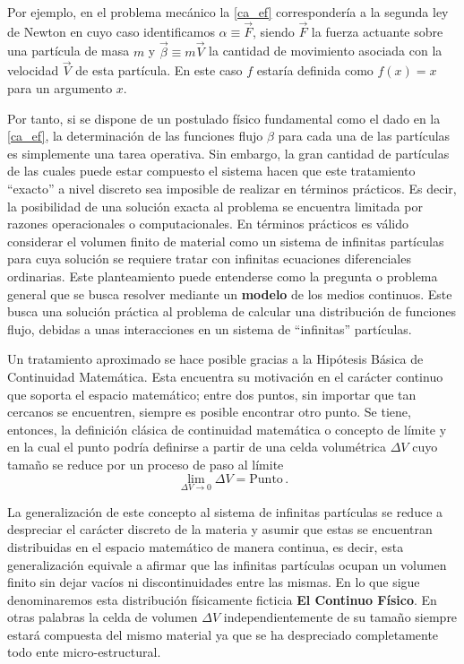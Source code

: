 \documentclass[../notas medios.tex]{subfiles}
\begin{document}
Por ejemplo, en el problema mecánico la \cref{ca_ef} correspondería a la segunda ley de Newton en cuyo caso identificamos $\alpha  \equiv \vec F$, siendo $\vec F$ la fuerza actuante sobre una partícula de masa $m$ y $\vec \beta  \equiv m\vec V$  la cantidad de movimiento asociada con la velocidad $\vec V$ de esta partícula.  En este caso $f$ estaría definida como  $f(x)=x$ para un argumento $x$.

Por tanto, si se dispone de un postulado físico fundamental como el dado en
la \cref{ca_ef}, la determinación de las funciones flujo $\beta$ para cada una de las partículas es simplemente una tarea operativa.  Sin embargo, la gran cantidad de partículas de las cuales puede estar compuesto el sistema hacen que este tratamiento ``exacto” a nivel discreto sea imposible de realizar en términos prácticos.  Es decir, la posibilidad de una solución exacta al problema se encuentra limitada por razones operacionales o computacionales. En términos prácticos es válido considerar el volumen finito de material como un sistema de infinitas partículas para cuya solución se requiere tratar con infinitas ecuaciones diferenciales ordinarias.  Este planteamiento puede entenderse como la pregunta o problema general que se busca resolver mediante un {\bf modelo} de los medios continuos. Este busca una solución práctica al problema de calcular una distribución de funciones flujo, debidas a unas interacciones en un sistema de ``infinitas” partículas.

Un tratamiento aproximado se hace posible gracias a la Hipótesis Básica de Continuidad Matemática.  Esta encuentra su motivación en el carácter continuo que soporta el espacio matemático; entre dos puntos, sin importar que tan cercanos se encuentren, siempre es posible encontrar otro punto. Se tiene, entonces,  la definición clásica de continuidad matemática o concepto de límite y en la cual el punto podría definirse a partir de una celda volumétrica $\Delta V$ cuyo tamaño se reduce por un proceso de paso al límite
\begin{equation}
\mathop {\lim }\limits_{\Delta V \to 0} \Delta V = \text{Punto}\, .
\label{lim_point}
\end{equation}

La generalización de este concepto al sistema de infinitas partículas se reduce a despreciar el carácter discreto de la materia y asumir que estas se encuentran distribuidas en el espacio matemático de manera continua, es decir, esta generalización equivale a afirmar que las infinitas partículas ocupan un volumen finito sin dejar vacíos ni discontinuidades entre las mismas. En lo que sigue denominaremos esta distribución físicamente ficticia {\bf El Continuo Físico}. En otras palabras la celda de volumen $\Delta V$  independientemente de su tamaño siempre estará compuesta del mismo material ya que se ha despreciado completamente todo ente micro-estructural.
\end{document}
